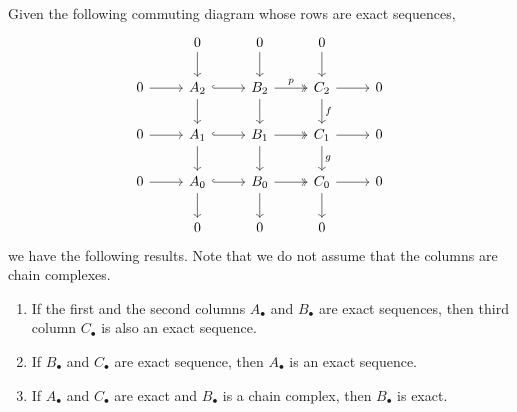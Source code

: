 \documentclass[main.tex]{subfiles}
\begin{document}
\begin{theorem}
  \label{thm:nine_lemma}
  Given the following commuting diagram whose rows are exact sequences,
  \begin{equation*}
    \begin{tikzcd}
      & 0
      \arrow[d]
      & 0
      \arrow[d]
      & 0
      \arrow[d]
      \\
      0
      \arrow[r]
      & A_{2}
      \arrow[r, hook]
      \arrow[d]
      & B_{2}
      \arrow[r, two heads, "p"]
      \arrow[d]
      & C_{2}
      \arrow[r]
      \arrow[d, "f"]
      & 0
      \\
      0
      \arrow[r]
      & A_{1}
      \arrow[r, hook]
      \arrow[d]
      & B_{1}
      \arrow[r, two heads]
      \arrow[d]
      & C_{1}
      \arrow[r]
      \arrow[d, "g"]
      & 0
      \\
      0
      \arrow[r]
      & A_{0}
      \arrow[r, hook]
      \arrow[d]
      & B_{0}
      \arrow[r, two heads]
      \arrow[d]
      & C_{0}
      \arrow[r]
      \arrow[d]
      & 0
      \\
      & 0
      & 0
      & 0
    \end{tikzcd}
  \end{equation*}
  we have the following results. Note that we do not assume that the columns are chain complexes.
  \begin{enumerate}
    \item If the first and the second columns $A_{\bullet}$ and $B_{\bullet}$ are exact sequences, then third column $C_{\bullet}$ is also an exact sequence.

    \item If $B_{\bullet}$ and $C_{\bullet}$ are exact sequence, then $A_{\bullet}$ is an exact sequence.

    \item If $A_{\bullet}$ and $C_{\bullet}$ are exact and $B_{\bullet}$ is a chain complex, then $B_{\bullet}$ is exact.
  \end{enumerate}
\end{theorem}
\end{document}
